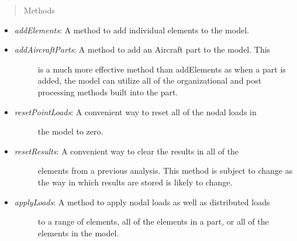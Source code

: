 \documentclass[letterpaper,10pt,english]{sphinxmanual}
\begin{document}
\begin{fulllineitems}
\begin{itemize}
\begin{description}
\end{description}

\end{itemize}
\begin{quote}\begin{description}
\item[{Methods}] \leavevmode
\end{description}\end{quote}
\begin{itemize}
\item {} 
\emph{addElements}: A method to add individual elements to the model.

\item {} \begin{description}
\item[{\emph{addAircraftParts}: A method to add an Aircraft part to the model. This}] \leavevmode
is a much more effective method than addElements as when a part is
added, the model can utilize all of the organizational and post
processing methods built into the part.

\end{description}

\item {} \begin{description}
\item[{\emph{resetPointLoads}: A convenient way to reset all of the nodal loads in}] \leavevmode
the model to zero.

\end{description}

\item {} \begin{description}
\item[{\emph{resetResults}: A convenient way to clear the results in all of the}] \leavevmode
elements from a previous analysis. This method is subject to change as
the way in which results are stored is likely to change.

\end{description}

\item {} \begin{description}
\item[{\emph{applyLoads}: A method to apply nodal loads as well as distributed loads}] \leavevmode
to a range of elements, all of the elements in a part, or all of the
elements in the model.

\end{description}


\end{itemize}
\end{fulllineitems}
\end{document}
